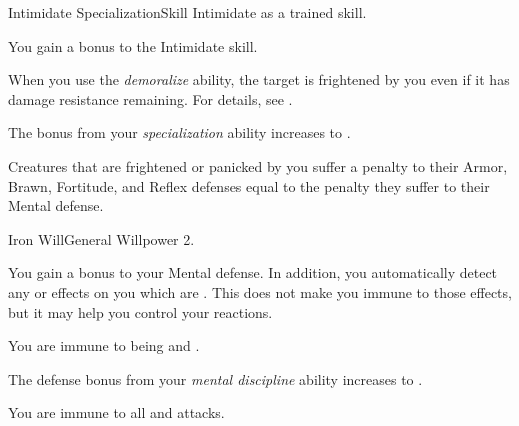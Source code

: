 


  \begin{feat}{Intimidate Specialization}{Skill}
    \featpre Intimidate as a trained skill.

     You gain a  bonus to the Intimidate skill.

     When you use the \textit{demoralize} ability, the target is frightened by you even if it has damage resistance remaining.
    For details, see .

     The bonus from your \textit{specialization} ability increases to .

     Creatures that are frightened or panicked by you suffer a penalty to their Armor, Brawn, Fortitude, and Reflex defenses equal to the penalty they suffer to their Mental defense.
  \end{feat}

  \begin{feat}{Iron Will}{General}
    \featpre Willpower 2.

     You gain a  bonus to your Mental defense.
    In addition, you automatically detect any  or  effects on you which are .
    This does not make you immune to those effects, but it may help you control your reactions.

     You are immune to being \stunned and \confused.

     The defense bonus from your \textit{mental discipline} ability increases to .

     You are immune to all  and  attacks.
  \end{feat}

